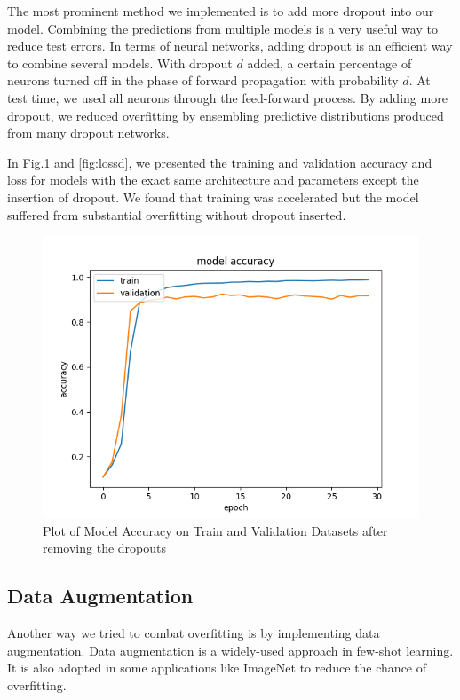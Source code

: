 \documentclass[10pt,conference]{IEEEtran}
\begin{document}
The most prominent method we implemented is to add more dropout into our model. Combining the predictions from multiple models is a very useful way to reduce test errors. In terms of neural networks, adding dropout is an efficient way to combine several models.\cite{hinton2012improving} With dropout $d$ added, a certain percentage of neurons turned off in the phase of forward propagation with probability $d$. At test time, we used all neurons through the feed-forward process. By adding more dropout, we reduced overfitting by ensembling predictive distributions produced from many dropout networks.

In Fig.\ref{fig:accd} and \ref{fig:lossd}, we presented the training and validation accuracy and loss for models with the exact same architecture and parameters except the insertion of dropout. We found that training was accelerated but the model suffered from substantial overfitting without dropout inserted. 

\begin{figure}[!tbhp]
\centering
\includegraphics[width = 0.85\linewidth]{acc_d.png}
\caption{Plot of Model Accuracy on Train and Validation Datasets after removing the dropouts}
\label{fig:accd}
\end{figure}

\subsection{Data Augmentation}
Another way we tried to combat overfitting is by implementing data augmentation. Data augmentation is a widely-used approach in few-shot learning\cite{fei2006one}. It is also adopted in some applications like ImageNet to reduce the chance of overfitting\cite{krizhevsky2012imagenet}. 
\end{document}
